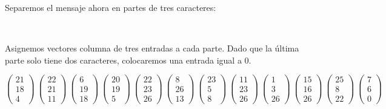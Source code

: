 \documentclass[12pt,a4paper]{article}
\begin{document}
Separemos el mensaje ahora en partes de tres caracteres:

\vspace{0.2cm}
\begin{center}
 ~ ~ ~\textara{\th}~  ~~   ~ ~ ~ ~  ~
\end{center}
\vspace{0.2cm}

Asignemos vectores columna de tres entradas a cada parte. Dado que la \'ultima parte solo tiene dos caracteres, colocaremos una entrada igual a 0.

{\tiny $$\left(\begin{array}{c}21\\18\\4\end{array}\right)~\left(\begin{array}{c}22\\21\\11\end{array}\right)~\left(\begin{array}{c}6\\19\\18\end{array}\right)~\left(\begin{array}{c}20\\19\\5\end{array}\right)~\left(\begin{array}{c}22\\23\\26\end{array}\right)~\left(\begin{array}{c}8\\26\\13\end{array}\right)~\left(\begin{array}{c}23\\5\\8\end{array}\right)~\left(\begin{array}{c}11\\23\\26\end{array}\right)~\left(\begin{array}{c}1\\3\\26\end{array}\right)~\left(\begin{array}{c}15\\16\\26\end{array}\right)~\left(\begin{array}{c}25\\8\\22\end{array}\right)~\left(\begin{array}{c}7\\6\\0\end{array}\right)$$}
 
\end{document}

